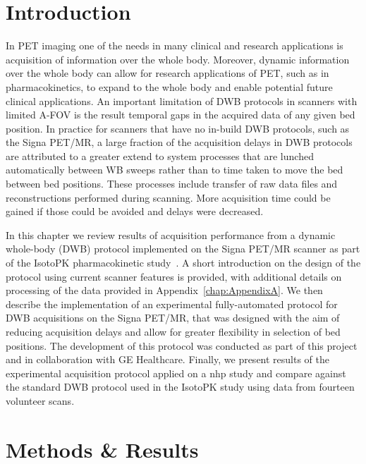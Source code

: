 \section{Introduction}
In PET imaging one of the needs in many clinical and research applications is acquisition of information over the whole body. Moreover, dynamic information over the whole body can allow for research applications of PET, such as in pharmacokinetics, to expand to the whole body and enable potential future clinical applications. 
An important limitation of DWB protocols in scanners with limited A-FOV is the result temporal gaps in the acquired data of any given bed position. %
In practice for scanners that have no in-build DWB protocols, such as the Signa PET/MR, a large fraction of the acquisition delays in DWB protocols are attributed to a greater extend to system processes that are lunched automatically between WB sweeps rather than to time taken to move the bed between bed positions. These processes include transfer of raw data files and reconstructions performed during scanning. More acquisition time could be gained if those could be avoided and delays were decreased.

In this chapter we review results of acquisition performance from a dynamic whole-body (DWB) protocol implemented on the Signa PET/MR scanner as part of the IsotoPK pharmacokinetic study~\cite{Marie2019}. A short introduction on the design of the protocol using current scanner features is provided, with additional details on processing of the data provided in Appendix~\ref{chap:AppendixA}.
We then describe the implementation of an experimental fully-automated protocol for DWB acquisitions on the Signa PET/MR, that was designed with the aim of reducing acquisition delays and allow for greater flexibility in selection of bed positions. The development of this protocol was conducted as part of this project and in collaboration with GE Healthcare. 
Finally, we present results of the experimental acquisition protocol applied on a \gls{nhp} study and compare against the standard DWB protocol used in the IsotoPK study using data from fourteen volunteer scans.

\section{Methods \& Results}

